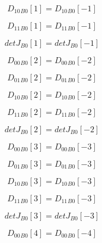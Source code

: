 \documentclass{article}
\begin{document}
\begin{dmath}{D_{10}{_{B0}}}[{1}] = {D_{10}{_{B0}}}[{-1}]\end{dmath}

\begin{dmath}{D_{11}{_{B0}}}[{1}] = {D_{11}{_{B0}}}[{-1}]\end{dmath}

\begin{dmath}{detJ{_{B0}}}[{1}] = {detJ{_{B0}}}[{-1}]\end{dmath}

\begin{dmath}{D_{00}{_{B0}}}[{2}] = {D_{00}{_{B0}}}[{-2}]\end{dmath}

\begin{dmath}{D_{01}{_{B0}}}[{2}] = {D_{01}{_{B0}}}[{-2}]\end{dmath}

\begin{dmath}{D_{10}{_{B0}}}[{2}] = {D_{10}{_{B0}}}[{-2}]\end{dmath}

\begin{dmath}{D_{11}{_{B0}}}[{2}] = {D_{11}{_{B0}}}[{-2}]\end{dmath}

\begin{dmath}{detJ{_{B0}}}[{2}] = {detJ{_{B0}}}[{-2}]\end{dmath}

\begin{dmath}{D_{00}{_{B0}}}[{3}] = {D_{00}{_{B0}}}[{-3}]\end{dmath}

\begin{dmath}{D_{01}{_{B0}}}[{3}] = {D_{01}{_{B0}}}[{-3}]\end{dmath}

\begin{dmath}{D_{10}{_{B0}}}[{3}] = {D_{10}{_{B0}}}[{-3}]\end{dmath}

\begin{dmath}{D_{11}{_{B0}}}[{3}] = {D_{11}{_{B0}}}[{-3}]\end{dmath}

\begin{dmath}{detJ{_{B0}}}[{3}] = {detJ{_{B0}}}[{-3}]\end{dmath}

\begin{dmath}{D_{00}{_{B0}}}[{4}] = {D_{00}{_{B0}}}[{-4}]\end{dmath}
\end{document}
